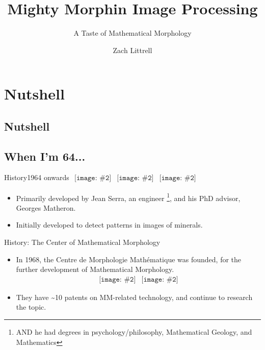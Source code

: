 \documentclass{beamer}
\title[A Taste of Mathematical Morphology]
      {Mighty Morphin Image Processing}
\subtitle{A Taste of Mathematical Morphology}
\author{Zach Littrell}
\institute{McDaniel College}
\newcommand{\pic}[2]{
     \begin{array}{l}
      \texttt{[image: \#2]}
      \end{array}
}
\begin{document}
\begin{frame}
  \titlepage
\end{frame}
\section{Nutshell}
\subsection{Nutshell}

\subsection{When I'm 64...}
\begin{frame}{History}{1964 onwards}
$\pic{width=100pt}{./images/matheron.jpg}
\pic{width=75pt}{./images/serra.jpg}
\pic{width=100pt}{images/petrograph.png}$

\begin{itemize} 
  \item Primarily developed by Jean Serra, an engineer
        \footnote{AND he had degrees in psychology/philosophy,
                  Mathematical Geology, and Mathematics},
        and his PhD advisor, Georges Matheron.
  \item Initially developed to detect patterns in images of minerals.
\end{itemize}
\end{frame}

\begin{frame}{History: The Center of Mathematical Morphology}
  \begin{itemize}
    \item In 1968, the Centre de Morphologie Math\'{e}matique 
          was founded, for the further development of Mathematical Morphology.
          $$\pic{width=100pt}{images/cmm.png}
            \pic{width=100pt}{images/directions.png}$$
          \item They have \textasciitilde 10 patents on MM-related technology,
                and continue to research the topic.
  \end{itemize}
\end{frame}

\end{document}
